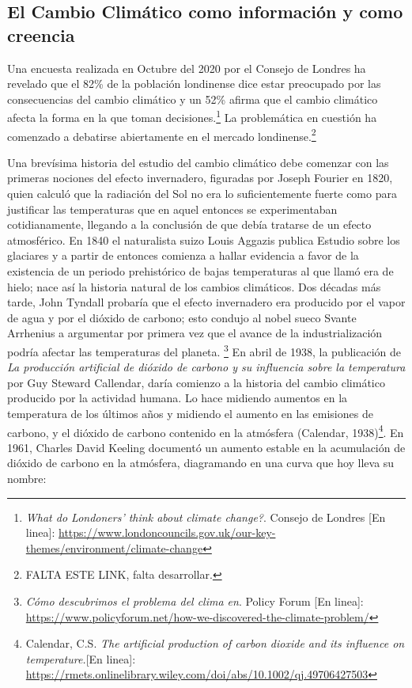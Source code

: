 \documentclass[12pt]{article}
\begin{document}
\subsection{El Cambio Climático como información y como creencia}
Una encuesta realizada en Octubre del 2020 por el Consejo de Londres ha revelado que el 82\% de la población londinense dice estar preocupado por las consecuencias del cambio climático y un 52\% afirma que el cambio climático afecta la forma en la que toman decisiones.\footnote{\textit{What do Londoners' think about climate change?}. Consejo de Londres [En linea]: \url{https://www.londoncouncils.gov.uk/our-key-themes/environment/climate-change} } La problemática en cuestión ha comenzado a debatirse abiertamente en el mercado londinense.\footnote{FALTA ESTE LINK, falta desarrollar.}  

Una brevísima historia del estudio del cambio climático debe comenzar con las primeras nociones del efecto invernadero, figuradas por Joseph Fourier en 1820, quien calculó que la radiación del Sol no era lo suficientemente fuerte como para justificar las temperaturas que en aquel entonces se experimentaban cotidianamente, llegando a la conclusión de que debía tratarse de un efecto atmosférico. En 1840 el naturalista suizo Louis Aggazis publica Estudio sobre los glaciares y a partir de entonces comienza a hallar evidencia a favor de la existencia de un periodo prehistórico de bajas temperaturas al que llamó era de hielo; nace así la historia natural de los cambios climáticos. Dos décadas más tarde, John Tyndall probaría que el efecto invernadero era producido por el vapor de agua y por el dióxido de carbono; esto condujo al nobel sueco Svante Arrhenius a argumentar por primera vez que el avance de la industrialización podría afectar las temperaturas del planeta. \footnote{\textit{Cómo descubrimos el problema del clima en}. Policy Forum [En linea]: \url{https://www.policyforum.net/how-we-discovered-the-climate-problem/}} En abril de 1938, la publicación de \textit{La producción artificial de dióxido de carbono y su influencia sobre la temperatura} por Guy Steward Callendar, daría comienzo a la historia del cambio climático producido por la actividad humana. Lo hace midiendo aumentos en la temperatura de los últimos años y midiendo el aumento en las emisiones de carbono, y el dióxido de carbono contenido en la atmósfera (Calendar, 1938)\footnote{Calendar, C.S. \textit{The artificial production of carbon dioxide and its influence on temperature.}[En linea]: \url{https://rmets.onlinelibrary.wiley.com/doi/abs/10.1002/qj.49706427503}}. En 1961, Charles David Keeling documentó un aumento estable en la acumulación de dióxido de carbono en la atmósfera, diagramando en una curva que hoy lleva su nombre:
\end{document}
